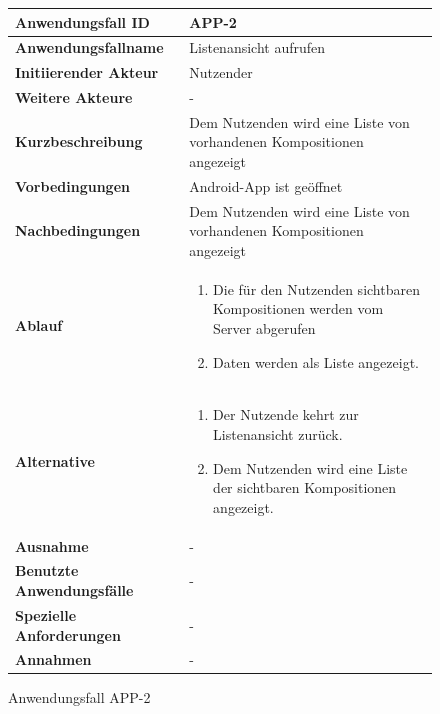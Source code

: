 \begin{figure}[h]
	\centering
	\begin{tabularx}{\textwidth}{ X | X }
		\textbf{Anwendungsfall ID} & APP-2 \\ \hline
		\textbf{Anwendungsfallname} & Listenansicht aufrufen \\ \hline
		\textbf{Initiierender Akteur} & Nutzender \\ \hline
		\textbf{Weitere Akteure} & -  \\ \hline
		\textbf{Kurzbeschreibung} & Dem Nutzenden wird eine Liste von vorhandenen Kompositionen angezeigt \\ \hline
		\textbf{Vorbedingungen} & Android-App ist geöffnet  \\ \hline
		\textbf{Nachbedingungen} & Dem Nutzenden wird eine Liste von vorhandenen Kompositionen angezeigt  \\ \hline
		\textbf{Ablauf} &
		\begin{enumerate}
			\item Die für den Nutzenden sichtbaren Kompositionen werden vom Server abgerufen
			\item Daten werden als Liste angezeigt.
		\end{enumerate} \\ \hline
		\textbf{Alternative} &
		\begin{enumerate}
			\item Der Nutzende kehrt zur Listenansicht zurück.
			\item Dem Nutzenden wird eine Liste der sichtbaren Kompositionen angezeigt.
		\end{enumerate}  \\ \hline
		\textbf{Ausnahme} &
		-  \\ \hline
		\textbf{Benutzte Anwendungsfälle} & - \\ \hline
		\textbf{Spezielle Anforderungen} & - \\ \hline
		\textbf{Annahmen} & -
	\end{tabularx}
	\caption{Anwendungsfall APP-2}
	\label{fig:anwendungsfall-app-tabelle-APP-2}
\end{figure}

\newpage

